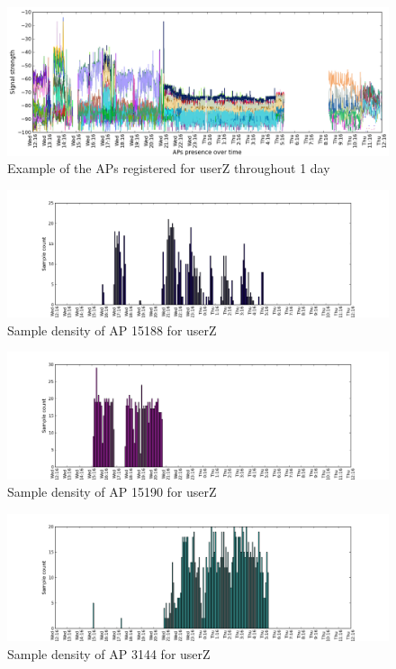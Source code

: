 \begin{figure}[h]
\centering
\includegraphics[width =\textwidth]{figures/combinations/user_6_sorted_1days_plot_croped.png}
\caption{Example of the APs registered for userZ throughout 1 day}
\label{rssi_6_2nd_day}
\end{figure}

\begin{figure}[h]
\centering
\includegraphics[width =\textwidth]{figures/combinations/ap_15188_histo.png}
\caption{Sample density of AP 15188 for userZ}
\label{samples_6_2nd_day_1}
\end{figure}

\begin{figure}[h]
\centering
\includegraphics[width =\textwidth]{figures/combinations/ap_15190_histo.png}
\caption{Sample density of AP 15190 for userZ}
\label{samples_6_2nd_day_2}
\end{figure}

\begin{figure}[h]
\centering
\includegraphics[width =\textwidth]{figures/combinations/ap_3144_histo.png}
\caption{Sample density of AP 3144 for userZ}
\label{samples_6_2nd_day_3}
\end{figure}

